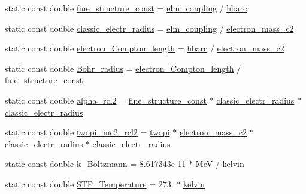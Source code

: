 \begin{DoxyCompactItemize}
\item 
static const double \hyperlink{namespacedd4hep_aa979b30c6c7f9ba61132327d4584bfde}{fine\+\_\+structure\+\_\+const} = \hyperlink{namespacedd4hep_ace30ae02d909a752d5e3f2138bf4ecb1}{elm\+\_\+coupling} / \hyperlink{namespacedd4hep_aee6340c5f86bb7ae1edcc2a90efa056e}{hbarc}
\item 
static const double \hyperlink{namespacedd4hep_ab829ac901c489f46802352c5e2b3c165}{classic\+\_\+electr\+\_\+radius} = \hyperlink{namespacedd4hep_ace30ae02d909a752d5e3f2138bf4ecb1}{elm\+\_\+coupling} / \hyperlink{namespacedd4hep_a90fb8853ce4da9b13bd108593b2d154d}{electron\+\_\+mass\+\_\+c2}
\item 
static const double \hyperlink{namespacedd4hep_ae9b92fa47cc9555cea0d6fa97a9036a3}{electron\+\_\+\+Compton\+\_\+length} = \hyperlink{namespacedd4hep_aee6340c5f86bb7ae1edcc2a90efa056e}{hbarc} / \hyperlink{namespacedd4hep_a90fb8853ce4da9b13bd108593b2d154d}{electron\+\_\+mass\+\_\+c2}
\item 
static const double \hyperlink{namespacedd4hep_a8ac45765a3f92b051e7536784ce5f6d3}{Bohr\+\_\+radius} = \hyperlink{namespacedd4hep_ae9b92fa47cc9555cea0d6fa97a9036a3}{electron\+\_\+\+Compton\+\_\+length} / \hyperlink{namespacedd4hep_aa979b30c6c7f9ba61132327d4584bfde}{fine\+\_\+structure\+\_\+const}
\item 
static const double \hyperlink{namespacedd4hep_affee5485f0351ee3618be1021c703e23}{alpha\+\_\+rcl2} = \hyperlink{namespacedd4hep_aa979b30c6c7f9ba61132327d4584bfde}{fine\+\_\+structure\+\_\+const} $\ast$ \hyperlink{namespacedd4hep_ab829ac901c489f46802352c5e2b3c165}{classic\+\_\+electr\+\_\+radius} $\ast$ \hyperlink{namespacedd4hep_ab829ac901c489f46802352c5e2b3c165}{classic\+\_\+electr\+\_\+radius}
\item 
static const double \hyperlink{namespacedd4hep_a5db1b84c8dc851581b5ba57b661f575f}{twopi\+\_\+mc2\+\_\+rcl2} = \hyperlink{namespacedd4hep_ae89c0c70c74b5fd0c1972865846822d7}{twopi} $\ast$ \hyperlink{namespacedd4hep_a90fb8853ce4da9b13bd108593b2d154d}{electron\+\_\+mass\+\_\+c2} $\ast$ \hyperlink{namespacedd4hep_ab829ac901c489f46802352c5e2b3c165}{classic\+\_\+electr\+\_\+radius} $\ast$ \hyperlink{namespacedd4hep_ab829ac901c489f46802352c5e2b3c165}{classic\+\_\+electr\+\_\+radius}
\item 
static const double \hyperlink{namespacedd4hep_afc99056ae68c67788d6d7555a866e175}{k\+\_\+\+Boltzmann} = 8.\+617343e-\/11 $\ast$ Me\+V / kelvin
\item 
static const double \hyperlink{namespacedd4hep_a3036c66b7815e25873b1183c2af953d6}{S\+T\+P\+\_\+\+Temperature} = 273. $\ast$ \hyperlink{namespacedd4hep_ae4984489719e11b38858934cc4c1e54e}{kelvin}

\end{DoxyCompactItemize}
